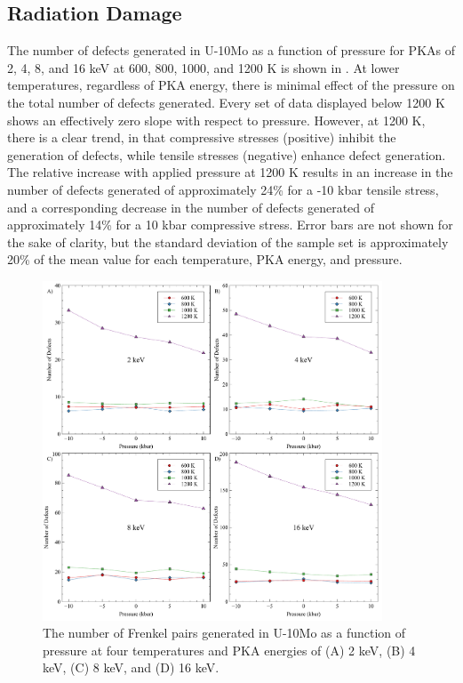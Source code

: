 \documentclass[review]{elsarticle}
\providecommand{\DIFaddend}{\protect\color{black}} %
\DeclareRobustCommand{\DIFaddend}{\DIFOaddend \let\includegraphics\DIFOincludegraphics} %
\begin{document}
\DIFaddend \FloatBarrier

\subsection{Radiation Damage}

The number of defects generated in U-10Mo as a function of pressure for PKAs of 2, 4, 8, and 16 keV at 600, 800, 1000, and 1200 K is shown in . At lower temperatures, regardless of PKA energy, there is minimal effect of the pressure on the total number of defects generated. Every set of data displayed below 1200 K shows an effectively zero slope with respect to pressure. However, at 1200 K, there is a clear trend, in that compressive stresses (positive) inhibit the generation of defects, while tensile stresses (negative) enhance defect generation. The relative increase with applied pressure at 1200 K results in an increase in the number of defects generated of approximately 24\% for a -10 kbar tensile stress, and a corresponding decrease in the number of defects generated of approximately 14\% for a 10 kbar compressive stress. Error bars are not shown for the sake of clarity, but the standard deviation of the sample set is approximately 20\% of the mean value for each temperature, PKA energy, and pressure. 

\begin{figure}[h!]
    \centering
    \includegraphics[width=0.9\textwidth]{rad_dam_P.pdf}
    \caption{The number of Frenkel pairs generated in U-10Mo as a function of pressure at four temperatures and PKA energies of (A) 2 keV, (B) 4 keV, (C) 8 keV, and (D) 16 keV.}
    \label{fig:rad_dam}
\end{figure}
\end{document}
